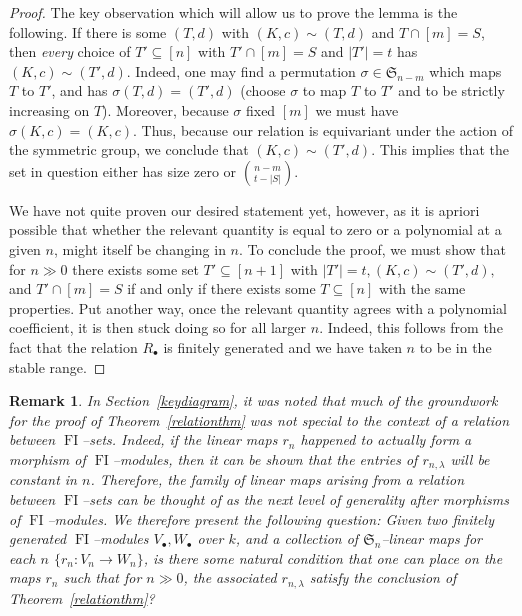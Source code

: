 \documentclass[10pt]{amsart}
\DeclareMathOperator{\FI}{FI}
\newcommand{\Sn}{\mathfrak{S}}
\newcommand{\dt}{\bullet}
\newtheorem{remark}[theorem]{Remark}
\theoremstyle{definition}
\begin{document}
\begin{proof}
The key observation which will allow us to prove the lemma is the following. If there is some $(T,d)$ with $(K,c) \sim (T,d)$ and $T \cap [m] = S$, then \emph{every} choice of $T' \subseteq [n]$ with $T' \cap [m] = S$ and $|T'| = t$ has $(K,c) \sim (T',d)$. Indeed, one may find a permutation $\sigma \in \Sn_{n-m}$ which maps $T$ to $T'$, and has $\sigma(T,d) = (T',d)$ (choose $\sigma$ to map $T$ to $T'$ and to be strictly increasing on $T$). Moreover, because $\sigma$ fixed $[m]$ we must have $\sigma(K,c) = (K,c)$. Thus, because our relation is equivariant under the action of the symmetric group, we conclude that $(K,c) \sim (T',d)$. This implies that the set in question either has size zero or $\binom{n-m}{t-|S|}$.

We have not quite proven our desired statement yet, however, as it is apriori possible that whether the relevant quantity is equal to zero or a polynomial at a given $n$, might itself be changing in $n$. To conclude the proof, we must show that for $n \gg 0$ there exists some set $T' \subseteq [n+1]$ with $|T'| = t, (K,c) \sim (T',d),$ and $T' \cap [m] = S$ if and only if there exists some $T \subseteq [n]$ with the same properties. Put another way, once the relevant quantity agrees with a polynomial coefficient, it is then stuck doing so for all larger $n$. Indeed, this follows from the fact that the relation $R_\dt$ is finitely generated and we have taken $n$ to be in the stable range.
\end{proof}

\begin{remark}
In Section~\ref{keydiagram}, it was noted that much of the groundwork for the proof of Theorem~\ref{relationthm} was not special to the context of a relation between $\FI$--sets. Indeed, if the linear maps $r_n$ happened to actually form a morphism of $\FI$--modules, then it can be shown that the entries of $r_{n,\lambda}$ will be constant in $n$. Therefore, the family of linear maps arising from a relation between $\FI$--sets can be thought of as the next level of generality after morphisms of $\FI$--modules. We therefore present the following question: Given two finitely generated $\FI$--modules $V_\dt,W_\dt$ over $k$, and a collection of $\Sn_n$--linear maps for each $n$ $\{r_n:V_n \rightarrow W_n\}$, is there some natural condition that one can place on the maps $r_n$ such that for $n \gg 0$, the associated $r_{n,\lambda}$ satisfy the conclusion of Theorem~\ref{relationthm}?
\end{remark}
\end{document}
